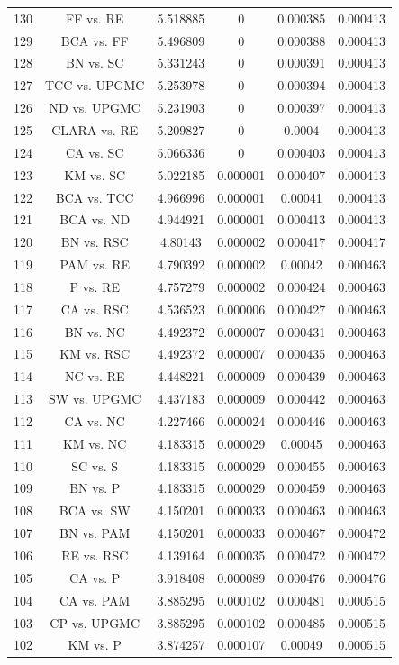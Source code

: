 \documentclass[a4paper,10pt]{article}
\begin{document}
\begin{landscape}
\begin{table}[!htp]
\begin{tabular}{cccccc}
130&FF vs. RE&5.518885&0&0.000385&0.000413\\
129&BCA vs. FF&5.496809&0&0.000388&0.000413\\
128&BN vs. SC&5.331243&0&0.000391&0.000413\\
127&TCC vs. UPGMC&5.253978&0&0.000394&0.000413\\
126&ND vs. UPGMC&5.231903&0&0.000397&0.000413\\
125&CLARA vs. RE&5.209827&0&0.0004&0.000413\\
124&CA vs. SC&5.066336&0&0.000403&0.000413\\
123&KM vs. SC&5.022185&0.000001&0.000407&0.000413\\
122&BCA vs. TCC&4.966996&0.000001&0.00041&0.000413\\
121&BCA vs. ND&4.944921&0.000001&0.000413&0.000413\\
120&BN vs. RSC&4.80143&0.000002&0.000417&0.000417\\
119&PAM vs. RE&4.790392&0.000002&0.00042&0.000463\\
118&P vs. RE&4.757279&0.000002&0.000424&0.000463\\
117&CA vs. RSC&4.536523&0.000006&0.000427&0.000463\\
116&BN vs. NC&4.492372&0.000007&0.000431&0.000463\\
115&KM vs. RSC&4.492372&0.000007&0.000435&0.000463\\
114&NC vs. RE&4.448221&0.000009&0.000439&0.000463\\
113&SW vs. UPGMC&4.437183&0.000009&0.000442&0.000463\\
112&CA vs. NC&4.227466&0.000024&0.000446&0.000463\\
111&KM vs. NC&4.183315&0.000029&0.00045&0.000463\\
110&SC vs. S&4.183315&0.000029&0.000455&0.000463\\
109&BN vs. P&4.183315&0.000029&0.000459&0.000463\\
108&BCA vs. SW&4.150201&0.000033&0.000463&0.000463\\
107&BN vs. PAM&4.150201&0.000033&0.000467&0.000472\\
106&RE vs. RSC&4.139164&0.000035&0.000472&0.000472\\
105&CA vs. P&3.918408&0.000089&0.000476&0.000476\\
104&CA vs. PAM&3.885295&0.000102&0.000481&0.000515\\
103&CP vs. UPGMC&3.885295&0.000102&0.000485&0.000515\\
102&KM vs. P&3.874257&0.000107&0.00049&0.000515\\

\end{tabular}
\end{table}
\end{landscape}
\end{document}
